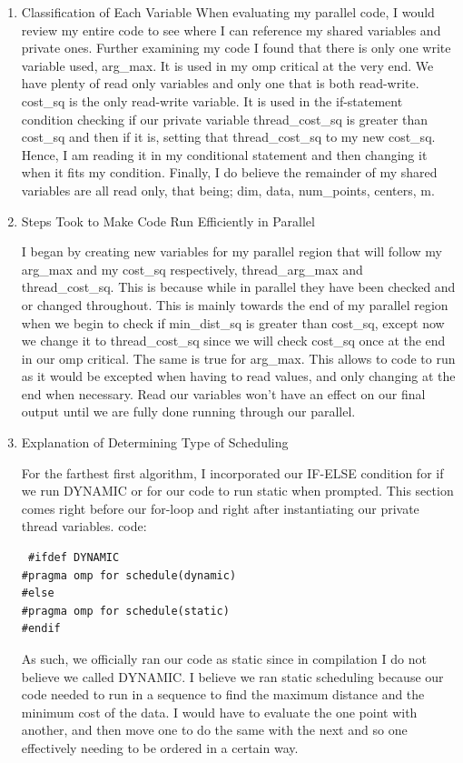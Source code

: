 \documentclass[12pt]{article}
\begin{document}
\begin{enumerate}
    \item Classification of Each Variable
When evaluating my parallel code, I would review my entire code to see where I can reference my shared variables and private ones. Further examining my code I found that there is only one write variable used, arg\_max. It is used in my omp critical at the very end. We have plenty of read only variables and only one that is both read-write. cost\_sq is the only read-write variable. It is used in the if-statement condition checking if our private variable thread\_cost\_sq is greater than cost\_sq and then if it is, setting that thread\_cost\_sq to my new cost\_sq. Hence, I am reading it in my conditional statement and then changing it when it fits my condition. Finally, I do believe the remainder of my shared variables are all read only, that being; dim, data, num\_points, centers, m.

    \item Steps Took to Make Code Run Efficiently in Parallel

I began by creating new variables for my parallel region that will follow my arg\_max and my cost\_sq respectively, thread\_arg\_max and thread\_cost\_sq. This is because while in parallel they have been checked and or changed throughout. This is mainly towards the end of my parallel region when we begin to check if min\_dist\_sq is greater than cost\_sq, except now we change it to thread\_cost\_sq since we will check cost\_sq once at the end in our omp critical. The same is true for arg\_max. This allows to code to run as it would be excepted when having to read values, and only changing at the end when necessary. Read our variables won't have an effect on our final output until we are fully done running through our parallel.

    \item Explanation of Determining Type of Scheduling

For the farthest first algorithm, I incorporated our IF-ELSE condition for if we run DYNAMIC or for our code to run static when prompted. This section comes right before our for-loop and right after instantiating our private thread variables. code:
\begin{verbatim}
 #ifdef DYNAMIC
#pragma omp for schedule(dynamic)
#else
#pragma omp for schedule(static)
#endif
\end{verbatim}
As such, we officially ran our code as static since in compilation I do not believe we called DYNAMIC. I believe we ran static scheduling because our code needed to run in a sequence to find the maximum distance and the minimum cost of the data. I would have to evaluate the one point with another, and then move one to do the same with the next and so one effectively needing to be ordered in a certain way.


\end{enumerate}
\end{document}
